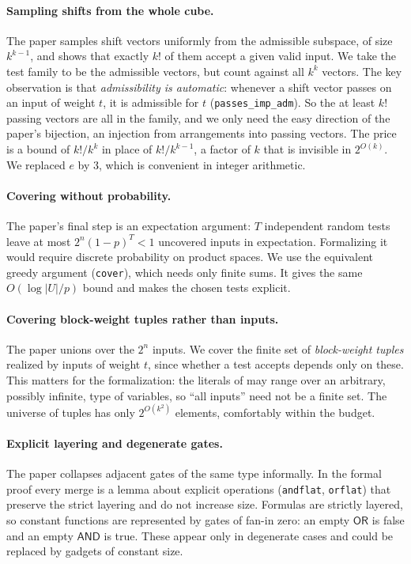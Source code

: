 \documentclass[11pt]{article}
\newcommand{\isa}[1]{\texttt{#1}}
\newcommand{\AND}{\mathsf{AND}}
\newcommand{\OR}{\mathsf{OR}}
\begin{document}
\paragraph{Sampling shifts from the whole cube.} The paper samples shift vectors uniformly from the admissible subspace, of size $k^{k-1}$, and shows that exactly $k!$ of them accept a given valid input. We take the test family to be the admissible vectors, but count against all $k^k$ vectors. The key observation is that \emph{admissibility is automatic}: whenever a shift vector passes on an input of weight $t$, it is admissible for $t$ (\isa{passes\_imp\_adm}). So the at least $k!$ passing vectors are all in the family, and we only need the easy direction of the paper's bijection, an injection from arrangements into passing vectors. The price is a bound of $k!/k^k$ in place of $k!/k^{k-1}$, a factor of $k$ that is invisible in $2^{O(k)}$. We replaced $e$ by $3$, which is convenient in integer arithmetic.

\paragraph{Covering without probability.} The paper's final step is an expectation argument: $T$ independent random tests leave at most $2^n(1-p)^T < 1$ uncovered inputs in expectation. Formalizing it would require discrete probability on product spaces. We use the equivalent greedy argument (\isa{cover}), which needs only finite sums. It gives the same $O(\log|U|/p)$ bound and makes the chosen tests explicit.

\paragraph{Covering block-weight tuples rather than inputs.} The paper unions over the $2^n$ inputs. We cover the finite set of \emph{block-weight tuples} realized by inputs of weight $t$, since whether a test accepts depends only on these. This matters for the formalization: the literals of  may range over an arbitrary, possibly infinite, type of variables, so ``all inputs'' need not be a finite set. The universe of tuples has only $2^{O(k^2)}$ elements, comfortably within the budget.

\paragraph{Explicit layering and degenerate gates.} The paper collapses adjacent gates of the same type informally. In the formal proof every merge is a lemma about explicit operations (\isa{andflat}, \isa{orflat}) that preserve the strict layering and do not increase size. Formulas are strictly layered, so constant functions are represented by gates of fan-in zero: an empty $\OR$ is false and an empty $\AND$ is true. These appear only in degenerate cases and could be replaced by gadgets of constant size.
\end{document}
